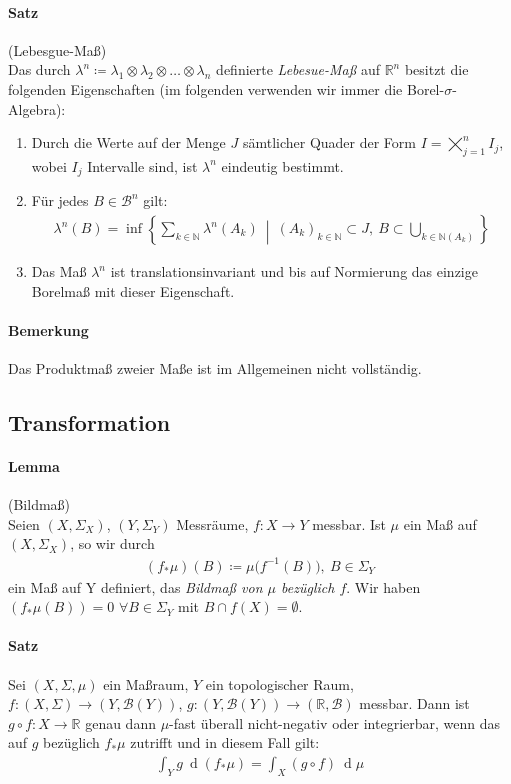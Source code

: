 \documentclass[12pt,a4paper,fleqn]{article}
\def\set#1{{\left\{ #1 \right\}}}
\def\Mid{\ \middle|\ }
\def\d{{\operatorname{d}}}
\begin{document}
\paragraph{Satz} (Lebesgue-Maß)\\
Das durch $\lambda^n \coloneqq \lambda_1 \otimes \lambda_2 \otimes \dotsc \otimes \lambda_n$ definierte \textit{Lebesue-Maß} auf $\mathbb{R}^n$ besitzt die folgenden Eigenschaften (im folgenden verwenden wir immer die Borel-$\sigma$-Algebra):
\begin{enumerate}
\item Durch die Werte auf der Menge $J$ sämtlicher Quader der Form $I = \bigtimes_{j=1}^n I_j$, wobei $I_j$ Intervalle sind, ist $\lambda^n$ eindeutig bestimmt.
\item Für jedes $B \in \mathcal{B}^n$ gilt:
\begin{align*}
\lambda^n(B) = \inf \set{\sum_{k \in \mathbb{N}} \lambda^n(A_k) \Mid (A_k)_{k \in \mathbb{N}} \subset J,\ B \subset \bigcup_{k \in \mathbb{N} (A_k)}}
\end{align*}
\item Das Maß $\lambda^n$ ist translationsinvariant und bis auf Normierung das einzige Borelmaß mit dieser Eigenschaft.
\end{enumerate}

\paragraph{Bemerkung} Das Produktmaß zweier Maße ist im Allgemeinen nicht vollständig.

\subsection{Transformation}
\paragraph{Lemma} (Bildmaß)\\
Seien $(X, \Sigma_X)$, $(Y, \Sigma_Y)$ Messräume, $f\colon X \rightarrow Y$ messbar. Ist $\mu$ ein Maß auf $(X, \Sigma_X)$, so wir durch 
\begin{align*}
(f_\ast\mu)(B) \coloneqq \mu\big(f^{-1}(B)\big),\ B \in \Sigma_Y
\end{align*}
ein Maß auf Y definiert, das \textit{Bildmaß von $\mu$ bezüglich $f$}. Wir haben \mbox{$(f_\ast\mu(B))= 0$} $\forall B \in \Sigma_Y$ mit $B \cap f(X) = \emptyset$.

\paragraph{Satz} Sei $(X, \Sigma, \mu)$ ein Maßraum, $Y$ ein topologischer Raum, \mbox{$f\colon (X, \Sigma) \rightarrow (Y, \mathcal{B}(Y))$}, $g\colon (Y, \mathcal{B}(Y)) \rightarrow (\mathbb{R}, \mathcal{B})$ messbar. Dann ist $g \circ f\colon X \rightarrow \mathbb{R}$ genau dann $\mu$-fast überall nicht-negativ oder integrierbar, wenn das auf $g$ bezüglich $f _\ast \mu$ zutrifft und in diesem Fall gilt:
\begin{align*}
\int_Y g\ \d(f_\ast \mu) = \int_X (g \circ f)\ \d\mu 
\end{align*}
\end{document}
